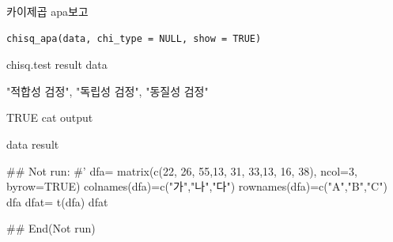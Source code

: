 \documentclass[a4paper]{book}
\begin{document}
%
\begin{Description}
카이제곱 apa보고
\end{Description}
%
\begin{Usage}
\begin{verbatim}
chisq_apa(data, chi_type = NULL, show = TRUE)
\end{verbatim}
\end{Usage}
%
\begin{Arguments}
\begin{ldescription}
\item[\code{data}] chisq.test result data

\item[\code{chi\_type}] "적합성 검정", "독립성 검정", "동질성 검정"

\item[\code{show}] TRUE cat output
\end{ldescription}
\end{Arguments}
%
\begin{Value}
data result
\end{Value}
%
\begin{Examples}
\begin{ExampleCode}

\#\# Not run: 
#'
dfa= matrix(c(22, 26, 55,13, 31, 33,13, 16, 38), ncol=3, byrow=TRUE)
colnames(dfa)=c("가","나","다")
rownames(dfa)=c("A","B","C")
dfa
dfat= t(dfa)
dfat%

## End(Not run)
\end{ExampleCode}
\end{Examples}
\end{document}
